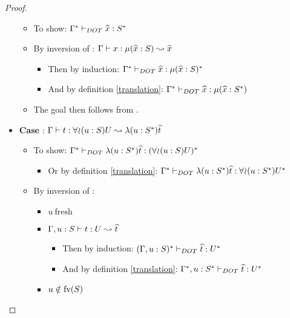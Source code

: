 \begin{proof}
\begin{itemize}
        \begin{itemize}
            \item To show: $\Gamma^{*} \vdash_{DOT} \widehat{x}: S^{*}$
            \item By inversion of :
                $\Gamma \vdash x: \mu(\widehat{x} : S) \leadsto \widehat{x}$
            \begin{itemize}
                \item Then by induction:
                    $\Gamma^{*} \vdash_{DOT} \widehat{x}: \mu(\widehat{x} : S)^{*}$
                \item And by definition \ref{translation}:
                    $\Gamma^{*} \vdash_{DOT} \widehat{x}: \mu(\widehat{x} : S^{*})$
            \end{itemize}
            \item The goal then follows from .
        \end{itemize}
        \item \textbf{Case} :
            $\Gamma \vdash t: \forall\!\wr\!(u:S)U \leadsto \lambda(u:S^{*})\widehat{t}$
        \begin{itemize}
            \item To show: $\Gamma^{*} \vdash_{DOT} \lambda(u:S^{*})\widehat{t}: (\forall\!\wr\!(u:S)U)^{*}$
            \begin{itemize}
                \item Or by definition \ref{translation}:
                    $\Gamma^{*} \vdash_{DOT} \lambda(u:S^{*})\widehat{t}: \forall\!\wr\!(u:S^{*})U^{*}$
            \end{itemize}
            \item By inversion of :
            \begin{itemize}
                \item $u\ \text{fresh}$
                \item $\Gamma, u: S \vdash t: U \leadsto \widehat{t}$
                \begin{itemize}
                    \item Then by induction:
                        $(\Gamma, u: S)^{*} \vdash_{DOT} \widehat{t}: U^{*}$
                    \item And by definition \ref{translation}:
                        $\Gamma^{*}, u: S^{*} \vdash_{DOT} \widehat{t}: U^{*}$
                \end{itemize}
                \item $u \notin \text{fv}(S)$
                \begin{itemize}

\end{itemize}
\end{itemize}
\end{itemize}
\end{itemize}
\end{proof}
